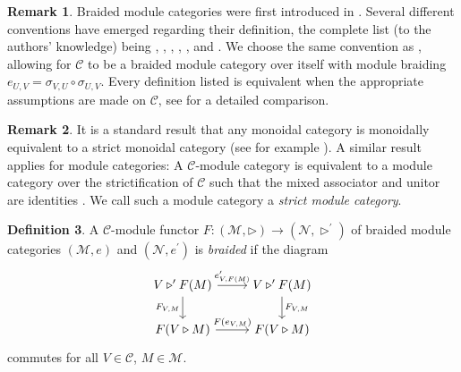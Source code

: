 \documentclass[12pt,dvipsnames]{article}
\numberwithin{equation}{section}
\theoremstyle{definition}
\newtheorem{definition}{Definition}[section]
\newtheorem{remark}[definition]{Remark}
\newcommand{\cat}[1]{\mathcal{#1}}
\newcommand{\1}{\ensuremath{\mathbbm{1}}}
\begin{document}
\begin{remark}\label{rem:bmc-definitions-compare}
    Braided module categories were first introduced in \cite{En04}. Several different conventions have emerged regarding their definition, the complete list (to the authors' knowledge) being \cite[Sec.\,4.3]{En04}, \cite[Sec.\,5.1]{Br12}, \cite[Def.\,3.4]{BBJ16}, \cite[Def.\,2.1]{Ko17}, \cite[Def.\,4.1]{DN20}, \cite[Sec.\,2.2]{JR21} and \cite[Def.\,3.5]{LWY23}. We choose the same convention as \cite[Def.\,3.5]{LWY23}, allowing for $\cat{C}$ to be a braided module category over itself with module braiding $e_{U,V} = \sigma_{V,U}\circ\sigma_{U,V}$. Every definition listed is equivalent when the appropriate assumptions are made on $\cat{C}$, see \cite[Rem.\,3.15]{LWY23} for a detailed comparison. 
\end{remark}
\begin{remark}
    It is a standard result that any monoidal category is monoidally equivalent to a strict monoidal category (see for example \cite[Thm.\,2.8.5]{EGNO15}). A similar result applies for module categories: A $\cat{C}$-module category is equivalent to a module category over the strictification of $\cat{C}$ such that the mixed associator and unitor are identities \cite[Sec.\,5.1]{Br12}. We call such a module category a \emph{strict module category}. 
\end{remark}
\begin{definition}
    A $\cat{C}$-module functor $F:(\cat{M},\triangleright)\to(\cat{N},\triangleright^\prime)$ of braided module categories $(\cat{M},e)$ and $(\cat{N},e^\prime)$ is \emph{braided} if the diagram
    \begin{equation}\label{eq:BrModFunct}
        \begin{tikzcd}
            V\triangleright^\prime F(M) & V\triangleright^\prime F(M) \\ F(V\triangleright M) & F(V\triangleright M)
            \arrow["{e^\prime_{V,F(M)}}", from=1-1, to=1-2] \arrow["{F_{V,M}}", from=1-2, to=2-2]
            \arrow["{F_{V,M}}"', from=1-1, to=2-1] \arrow["{F(e_{V,M})}", from=2-1, to=2-2]
        \end{tikzcd}
    \end{equation}
    commutes for all
    $V \in \cat{C}$, $M \in \cat{M}$.
\end{definition}
\end{document}
